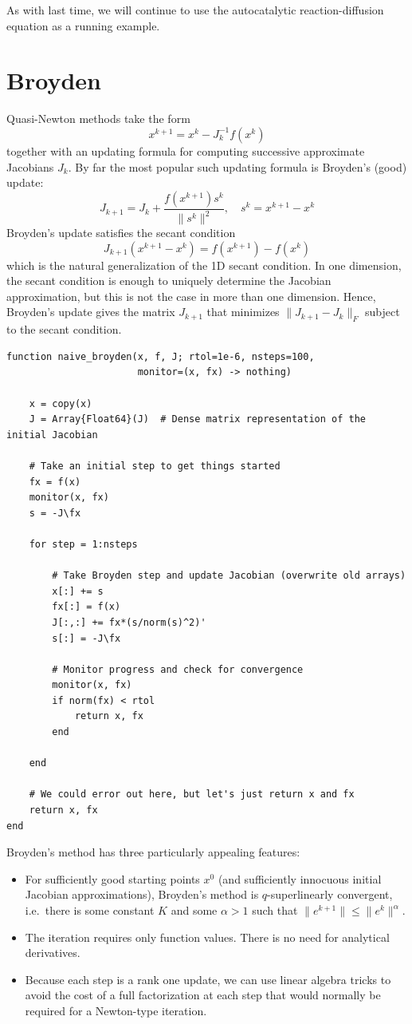 \documentclass[12pt, leqno]{article} %
\providecommand{\tightlist}{%
  \setlength{\itemsep}{0pt}\setlength{\parskip}{0pt}}
\begin{document}
As with last time, we will continue to use the autocatalytic
reaction-diffusion equation as a running example.

\section{Broyden}

Quasi-Newton methods take the form \[x^{k+1} = x^k - J_k^{-1} f(x^k)\]
together with an updating formula for computing successive approximate
Jacobians \(J_k\). By far the most popular such updating formula is
Broyden's (good) update:
\[J_{k+1} = J_k + \frac{f(x^{k+1}) s^k}{\|s^k\|^2}, \quad s^k = x^{k+1}-x^k\]
Broyden's update satisfies the secant condition
\[J_{k+1} (x^{k+1}-x^k) = f(x^{k+1})-f(x^k)\] which is the natural
generalization of the 1D secant condition. In one dimension, the secant
condition is enough to uniquely determine the Jacobian approximation,
but this is not the case in more than one dimension. Hence, Broyden's
update gives the matrix \(J_{k+1}\) that minimizes \(\|J_{k+1}-J_k\|_F\)
subject to the secant condition.

\begin{verbatim}
function naive_broyden(x, f, J; rtol=1e-6, nsteps=100,
                       monitor=(x, fx) -> nothing)

    x = copy(x)
    J = Array{Float64}(J)  # Dense matrix representation of the initial Jacobian

    # Take an initial step to get things started
    fx = f(x)
    monitor(x, fx)
    s = -J\fx
    
    for step = 1:nsteps

        # Take Broyden step and update Jacobian (overwrite old arrays)
        x[:] += s
        fx[:] = f(x)
        J[:,:] += fx*(s/norm(s)^2)'
        s[:] = -J\fx

        # Monitor progress and check for convergence
        monitor(x, fx)
        if norm(fx) < rtol
            return x, fx
        end

    end
    
    # We could error out here, but let's just return x and fx
    return x, fx
end
\end{verbatim}

Broyden's method has three particularly appealing features:

\begin{itemize}
\tightlist
\item
  For sufficiently good starting points \(x^0\) (and sufficiently
  innocuous initial Jacobian approximations), Broyden's method is
  \(q\)-superlinearly convergent, i.e.~there is some constant \(K\) and
  some \(\alpha > 1\) such that \(\|e^{k+1}\| \leq \|e^k\|^\alpha\).
\item
  The iteration requires only function values. There is no need for
  analytical derivatives.
\item
  Because each step is a rank one update, we can use linear algebra
  tricks to avoid the cost of a full factorization at each step that
  would normally be required for a Newton-type iteration.
\end{itemize}
\end{document}
